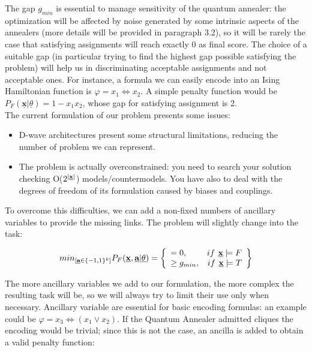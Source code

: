 The gap $g_{min}$ is essential to manage sensitivity of the quantum annealer: the optimization will be affected by noise generated by some intrinsic aspects of the annealers (more details will be provided in paragraph 3.2), so it will be rarely the case that satisfying assignments will reach exactly 0 as final score. The choice of a suitable gap (in particular trying to find the highest gap possible satisfying the problem) will help us in discriminating acceptable assignments and not acceptable ones.
For instance, a formula we can easily encode into an Ising Hamiltonian function is $\varphi = x_1 \iff x_2$. A simple penalty function would be $P_F(\underline{\textbf{x}} | \underline{\theta}) = 1 - x_1x_2$, whose gap for satisfying assignment is 2. \\
The current formulation of our problem presents some issues:

\begin{itemize}
    \item D-wave architectures present some structural limitations, reducing the number of problem we can represent.
    \item The problem is actually overconstrained: you need to search your solution checking O($2^{|\textbf{\underline{x}}|}$) models/countermodels. You have also to deal with the degrees of freedom of its formulation caused by biases and couplings.
\end{itemize}

To overcome this difficulties, we can add a non-fixed numbers of ancillary variables to provide the missing links. The problem will slightly change into the task:

\begin{equation}
    min_{[\textbf{\underline{a}} \in \{-1,1\}^k]} P_F(\underline{\textbf{x}},\underline{\textbf{a}} | \underline{\theta}) = 
    \left\{
        \begin{array}{lr}
            = 0, & if \textbf{ \underline{x}} \models F \\
            \geq g_{min}, & if \textbf{ \underline{x}} \models T
        \end{array}
    \right\}
\end{equation}

The more ancillary variables we add to our formulation, the more complex the resulting task will be, so we will always try to limit their use only when necessary. Ancillary variable are essential for basic encoding formulas: an example could be $\varphi = x_3 \iff (x_1 \vee x_2)$. If the Quantum Annealer admitted cliques the encoding would be trivial; since this is not the case, an ancilla is added to obtain a valid penalty function:

